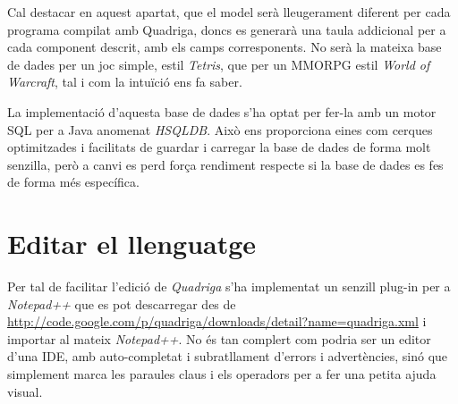  Cal destacar en aquest apartat, que el model serà lleugerament diferent per cada programa compilat amb Quadriga, doncs es generarà una taula addicional per a cada component descrit, amb els camps corresponents. No serà la mateixa base de dades per un joc simple, estil {\em Tetris}, que per un MMORPG estil {\em World of Warcraft}, tal i com la intuïció ens fa saber.
  
  La implementació d'aquesta base de dades s'ha optat per fer-la amb un motor SQL per a Java anomenat {\em HSQLDB}. Això ens proporciona eines com cerques optimitzades i facilitats de guardar i carregar la base de dades de forma molt senzilla, però a canvi es perd força rendiment respecte si la base de dades es fes de forma més específica.

\section{Editar el llenguatge}

  Per tal de facilitar l'edició de {\em Quadriga} s'ha implementat un senzill plug-in per a {\em Notepad++} que es pot descarregar des de \url{http://code.google.com/p/quadriga/downloads/detail?name=quadriga.xml} i importar al mateix {\em Notepad++}. No és tan complert com podria ser un editor d'una IDE, amb auto-completat i subratllament d'errors i advertències, sinó que simplement marca les paraules claus i els operadors per a fer una petita ajuda visual.